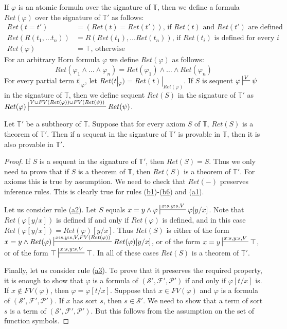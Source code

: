 \documentclass{elsarticle}
\newcommand{\axref}[1]{(\hyperref[ax:#1]{#1})}
\theoremstyle{definition}
\theoremstyle{remark}
\numberwithin{figure}{section}
\begin{document}
If $\varphi$ is an atomic formula over the signature of $\mathbb{T}$, then we define a formula $Ret(\varphi)$ over the signature of $\mathbb{T}'$ as follows:
\begin{align*}
Ret(t = t') & = (Ret(t) = Ret(t')) \text{, if $Ret(t)$ and $Ret(t')$ are defined} \\
Ret(R(t_1, \ldots t_n)) & = R(Ret(t_1), \ldots Ret(t_n)) \text{, if $Ret(t_i)$ is defined for every $i$} \\
Ret(\varphi) & = \top \text{, otherwise}
\end{align*}
For an arbitrary Horn formula $\varphi$ we define $Ret(\varphi)$ as follows:
\[ Ret(\varphi_1 \land \ldots \land \varphi_n) = Ret(\varphi_1) \land \ldots \land Ret(\varphi_n) \]
For every partial term $t|_\varphi$, let $Ret(t|_\varphi) = Ret(t)|_{Ret(\varphi)}$.
If $S$ is sequent $\varphi \sststile{}{V} \psi$ in the signature of $\mathbb{T}$,
    then we define sequent $Ret(S)$ in the signature of $\mathbb{T}'$ as $Ret(\varphi) \sststile{}{V \cup FV(Ret(\varphi)) \cup FV(Ret(\psi))} Ret(\psi)$.

\begin{lem}[subtheory]
Let $\mathbb{T}'$ be a subtheory of $\mathbb{T}$.
Suppose that for every axiom $S$ of $\mathbb{T}$, $Ret(S)$ is a theorem of $\mathbb{T}'$.
Then if a sequent in the signature of $\mathbb{T}'$ is provable in $\mathbb{T}$, then it is also provable in $\mathbb{T}'$.
\end{lem}
\begin{proof}
If $S$ is a sequent in the signature of $\mathbb{T}'$, then $Ret(S) = S$.
Thus we only need to prove that if $S$ is a theorem of $\mathbb{T}$, then $Ret(S)$ is a theorem of $\mathbb{T}'$.
For axioms this is true by assumption.
We need to check that $Ret(-)$ preserves inference rules.
This is clearly true for rules \axref{b1}-\axref{b6} and \axref{a1}.

Let us consider rule \axref{a2}.
Let $S$ equals $x = y \land \varphi \sststile{}{x:s,y:s,V} \varphi[y/x]$.
Note that $Ret(\varphi[y/x])$ is defined if and only if $Ret(\varphi)$ is defined, and in this case $Ret(\varphi[y/x]) = Ret(\varphi)[y/x]$.
Thus $Ret(S)$ is either of the form $x = y \land Ret(\varphi) \allowbreak \sststile{}{x:s,y:s,V,FV(Ret(\varphi))} Ret(\varphi)[y/x]$,
or of the form $x = y \sststile{}{x:s,y:s,V} \top$, or of the form $\top \sststile{}{x:s,y:s,V} \top$.
In all of these cases $Ret(S)$ is a theorem of $\mathbb{T}'$.

Finally, let us consider rule \axref{a3}.
To prove that it preserves the required property, it is enough to show that $\varphi$ is a formula of $(\mathcal{S}',\mathcal{F}',\mathcal{P}')$ if and only if $\varphi[t/x]$ is.
If $x \notin FV(\varphi)$, then $\varphi = \varphi[t/x]$.
Suppose that $x \in FV(\varphi)$ and $\varphi$ is a formula of $(\mathcal{S}',\mathcal{F}',\mathcal{P}')$.
If $x$ has sort $s$, then $s \in \mathcal{S}'$.
We need to show that a term of sort $s$ is a term of $(\mathcal{S}',\mathcal{F}',\mathcal{P}')$.
But this follows from the assumption on the set of function symbols.
\end{proof}
\end{document}
